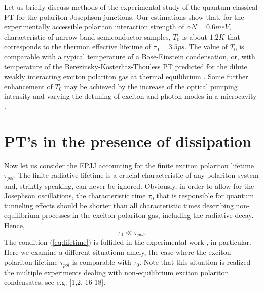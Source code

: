 \documentclass[aps, pre, preprint, groupedaddress, superscriptaddress, showkeys, showpacs] {revtex4-1}
\begin{document}
Let us briefly discuss methods of the experimental study of the quantum-classical PT for the polariton Josephson junctions.
Our estimations show that, for the experimentally accessible polariton interaction strength of $\alpha N=0.6meV$, characteristic of narrow-band semiconductor samples, $T_{0}$ is about $1.2K$ that corresponds to the thermon effective lifetime of $\tau_{0}=3.5ps$.
The value of $T_{0}$ is comparable with a typical temperature of a Bose-Einstein condensation, or, with temperature of the Berezinsky-Kosterlitz-Thouless PT predicted for the dilute weakly interacting exciton polariton gas at thermal equilibrium \cite{Sanvitto,Guillet}.
Some further enhancement of $T_{0}$ may be achieved by the increase of the optical pumping intensity and varying the detuning of exciton and photon modes in a microcavity \cite{Snoke_2017}.  

\section{PT's in the presence of dissipation 
\label{sec:non-equilibrium}}

Now let us consider the EPJJ accounting for the finite exciton polariton lifetime $\tau_{pol}$. 
The finite radiative lifetime is a crucial characteristic of any polariton system and, striktly speaking, can never be ignored.
Obviously, in order to allow for the Josephson oscillations, the characteristic time $\tau_0$ that is responsible for quantum tunneling effects  should be shorter than all characteristic times describing non-equilibrium processes in the exciton-polariton gas, including the radiative decay. Hence,
%
\begin{equation}
\tau_{0}\ll\tau_{pol}.
\label{eq:lifetime}  
\end{equation}
%
The condition (\ref{eq:lifetime}) is fulfilled in the experimental work \cite{Dominici}, in particular.
Here we examine a different situationn amely, the case where the exciton polariton lifetime $\tau_{pol}$ is comparable with $\tau_{0}$.
Note that this situation is realized the multiple experiments dealing with non-equilibrium exciton polariton condensates, see e.g. [1,2, 16-18].  
\end{document}
